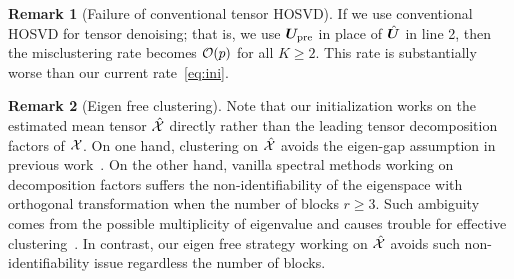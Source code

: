 \documentclass[lettersize,onecolumn,journal]{IEEEtran}
\theoremstyle{definition}
\theoremstyle{definition}
\newtheorem{rmk}{Remark}
\begin{document}

\begin{rmk}[Failure of conventional tensor HOSVD] If we use conventional HOSVD for tensor denoising; that is, we use $\bm{U}_{\text{pre}}$ in place of $\hat {\bm{U}}$ in line 2, then the misclustering rate becomes $\mathcal{O}(p)$ for all $K\geq 2$. This rate is substantially worse than our current rate~\eqref{eq:ini}.
\end{rmk}

{
\color{blue}

\begin{rmk}[Eigen free clustering] Note that our initialization works on the estimated mean tensor $\hat {\mathcal{X}}$ directly rather than the leading tensor decomposition factors of $\mathcal{X}$. On one hand,  clustering on $\hat {\mathcal{X}}$ avoids the eigen-gap assumption in previous work~\cite{ke2019community}. On the other hand,  vanilla spectral methods working on decomposition factors suffers the non-identifiability of the eigenspace with orthogonal transformation when the number of blocks $r \geq 3$. Such ambiguity comes from the possible multiplicity of eigenvalue and causes trouble for effective clustering~\citep{abbe2020entrywise}. In contrast, our eigen free strategy working on $\hat {\mathcal{X}}$ avoids such non-identifiability issue regardless the number of blocks.
\end{rmk}


}
\end{document}
